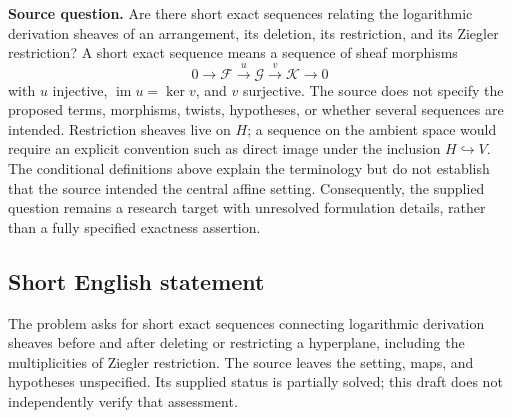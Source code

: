 \documentclass[11pt]{article}
\begin{document}
\textbf{Source question.} Are there short exact sequences relating the logarithmic derivation sheaves of an arrangement, its deletion, its restriction, and its Ziegler restriction? A short exact sequence means a sequence of sheaf morphisms
\[
0\longrightarrow\mathcal F\xrightarrow{u}\mathcal G\xrightarrow{v}\mathcal K\longrightarrow0
\]
with \(u\) injective, \(\operatorname{im}u=\ker v\), and \(v\) surjective. The source does not specify the proposed terms, morphisms, twists, hypotheses, or whether several sequences are intended. Restriction sheaves live on \(H\); a sequence on the ambient space would require an explicit convention such as direct image under the inclusion \(H\hookrightarrow V\). The conditional definitions above explain the terminology but do not establish that the source intended the central affine setting. Consequently, the supplied question remains a research target with unresolved formulation details, rather than a fully specified exactness assertion.
\subsection{Short English statement}
The problem asks for short exact sequences connecting logarithmic derivation sheaves before and after deleting or restricting a hyperplane, including the multiplicities of Ziegler restriction. The source leaves the setting, maps, and hypotheses unspecified. Its supplied status is partially solved; this draft does not independently verify that assessment.
\end{document}
